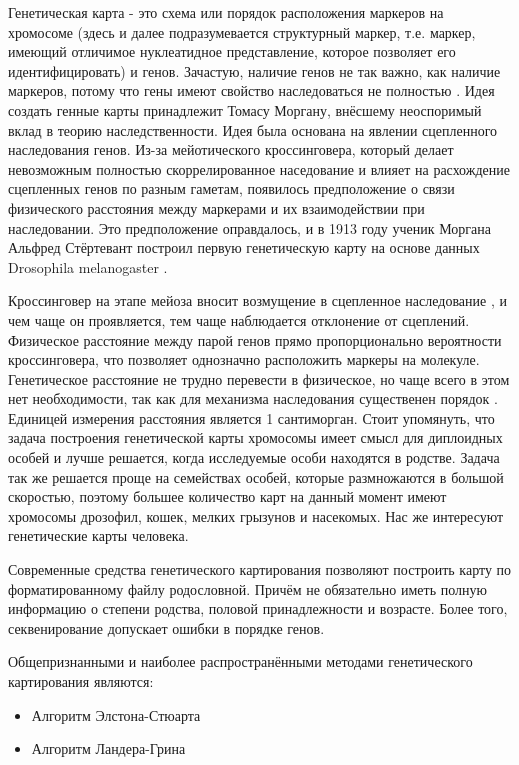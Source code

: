 \documentclass{matmex-diploma-custom}
\begin{document}
Генетическая карта - это схема или порядок расположения маркеров на
хромосоме (здесь и далее подразумевается структурный маркер,
т.е. маркер, имеющий отличимое нуклеатидное представление, которое
позволяет его идентифицировать) и генов. Зачастую, наличие генов не
так важно, как наличие маркеров, потому что гены имеют свойство
наследоваться не полностью \cite{thirdConf}. Идея создать генные карты
принадлежит Томасу Моргану, внёсшему неоспоримый вклад в теорию
наследственности. Идея была основана на явлении сцепленного
наследования генов. Из-за мейотического кроссинговера, который делает
невозможным полностью скоррелированное наседование и влияет на
расхождение сцепленных генов по разным гаметам, появилось
предположение о связи физического расстояния между маркерами и их
взаимодействии при наследовании. Это предположение оправдалось, и в
1913 году ученик Моргана Альфред Стёртевант построил первую
генетическую карту на основе данных Drosophila melanogaster
\cite{evolution, stertevant}.

Кроссинговер на этапе мейоза вносит возмущение в сцепленное
наследование \cite{clontock}, и чем чаще он проявляется, тем чаще
наблюдается отклонение от сцеплений. Физическое расстояние между парой
генов прямо пропорционально вероятности кроссинговера, что позволяет
однозначно расположить маркеры на молекуле. Генетическое расстояние не
трудно перевести в физическое, но чаще всего в этом нет необходимости,
так как для механизма наследования существенен порядок
\cite{genetics}. Единицей измерения расстояния является 1
сантиморган. Стоит упомянуть, что задача построения генетической карты
хромосомы имеет смысл для диплоидных особей и лучше решается, когда
исследуемые особи находятся в родстве. Задача так же решается проще на
семействах особей, которые размножаются в большой скоростью, поэтому
большее количество карт на данный момент имеют хромосомы дрозофил,
кошек, мелких грызунов и насекомых. Нас же интересуют генетические
карты человека.

Современные средства генетического картирования позволяют построить
карту по форматированному файлу родословной. Причём не обязательно
иметь полную информацию о степени родства, половой принадлежности и
возрасте. Более того, секвенирование допускает ошибки в порядке генов.

Общепризнанными и наиболее распространёнными методами генетического
картирования являются:
\begin{itemize}
\item Алгоритм Элстона-Стюарта
\item Алгоритм Ландера-Грина
\end{itemize}
\end{document}
